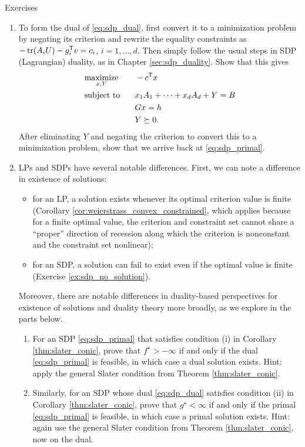 \begin{xcb}{Exercises}
\begin{enumerate}[label=\thechapter.\arabic*]
\item \label{ex:sdp_dual_dual}
  To form the dual of \eqref{eq:sdp_dual}, first convert it to a minimization
  problem by negating its criterion and rewrite the equality constraints as
  $-\operatorname{tr}(A_iU) - g_i^{\mathsf{T}} v = c_i$, $i = 1,\dots,d$. Then simply follow the usual
  steps in SDP (Lagrangian) duality, as in Chapter \ref{sec:sdp_duality}. Show
  that this gives    
  \begin{alignat*}{2}
  &\operatorname*{maximize}_{x,Y} \quad && -c^{\mathsf{T}} x \\ 
  &\operatorname{subject\,\,to} && x_1 A_1 + \cdots + x_d A_d + Y = B \\
  & && Gx = h \\
  & && Y \succeq 0.
  \end{alignat*}
  After eliminating $Y$ and negating the criterion to convert this to a
  minimization problem, show that we arrive back at \eqref{eq:sdp_primal}.  

\item \label{ex:lp_sdp_differences}
  LPs and SDPs have several notable differences. First, we can note a difference
  in existence of solutions:
  \begin{itemize}
  \item for an LP, a solution exists whenever its optimal criterion value is
    finite (Corollary \ref{cor:weierstrass_convex_constrained}, which applies
    because for a finite optimal value, the criterion and constraint set cannot
    share a ``proper'' direction of recession along which the criterion is
    nonconstant and the constraint set nonlinear);     
  \item for an SDP, a solution can fail to exist even if the optimal value is
    finite (Exercise \ref{ex:sdp_no_solution}).   
  \end{itemize}
  Moreover, there are notable differences in duality-based perspectives for
  existence of solutions and duality theory more broadly, as we explore in the
  parts below. 

\begin{enumerate}[label=\alph*.]
\item For an SDP \eqref{eq:sdp_primal} that satisfies condition (i) in Corollary 
  \ref{thm:slater_conic}, prove that $f^\star > -\infty$ if and only if the dual 
  \eqref{eq:sdp_primal} is feasible, in which case a dual solution exists. Hint:
  apply the general Slater condition from Theorem \ref{thm:slater_conic}.   

\item Similarly, for an SDP whose dual \eqref{eq:sdp_dual} satisfies condition
  (ii) in Corollary \ref{thm:slater_conic}, prove that $g^\star < \infty$ if and
  only if the primal \eqref{eq:sdp_primal} is feasible, in which case a primal
  solution exists. Hint: again use the general Slater condition from Theorem  
  \ref{thm:slater_conic}, now on the dual. 


\end{enumerate}
\end{enumerate}
\end{xcb}
